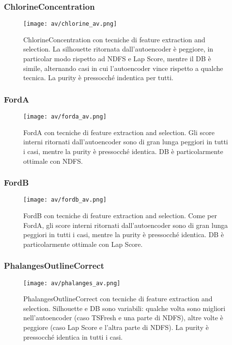 \subsubsection{ChlorineConcentration}
\begin{figure}[H]
	\centering
	\texttt{[image: av/chlorine\_av.png]}
	\caption{ChlorineConcentration con tecniche di feature extraction and selection. La silhouette ritornata dall'autoencoder è peggiore, in particolar modo rispetto ad NDFS e Lap Score, mentre il DB è simile, alternando casi in cui l'autoencoder vince rispetto a qualche tecnica. La purity è pressocché indentica per tutti.}
	\label{fig:chlorine_av}
\end{figure}

\subsubsection{FordA}
\begin{figure}[H]
	\centering
	\texttt{[image: av/forda\_av.png]}
	\caption{FordA con tecniche di feature extraction and selection. Gli score interni ritornati dall'autoencoder sono di gran lunga peggiori in tutti i casi, mentre la purity è pressocché identica. DB è particolarmente ottimale con NDFS.}
	\label{fig:forda_av}
\end{figure}

\subsubsection{FordB}
\begin{figure}[H]
	\centering
	\texttt{[image: av/fordb\_av.png]}
	\caption{FordB con tecniche di feature extraction and selection. Come per FordA, gli score interni ritornati dall'autoencoder sono di gran lunga peggiori in tutti i casi, mentre la purity è pressocché identica. DB è particolarmente ottimale con Lap Score.}
	\label{fig:fordb_av}
\end{figure}

\subsubsection{PhalangesOutlineCorrect}
\begin{figure}[H]
	\centering
	\texttt{[image: av/phalanges\_av.png]}
	\caption{PhalangesOutlineCorrect con tecniche di feature extraction and selection. Silhouette e DB sono variabili: qualche volta sono migliori nell'autoencoder (caso TSFresh e una parte di NDFS), altre volte è peggiore (caso Lap Score e l'altra parte di NDFS). La purity è pressocché identica in tutti i casi.}
	\label{fig:phalanges_av}
\end{figure}

